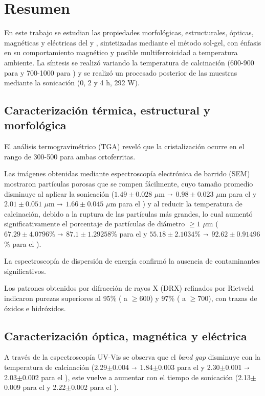 \documentclass[../main.tex]{subfiles}
\begin{document}
\chapter{Resumen}
En este trabajo se estudian las propiedades morfológicas, estructurales, ópticas, magnéticas y eléctricas del \neod{} y \sama{}, sintetizadas mediante el método sol-gel, con énfasis en su comportamiento magnético y posible multiferroicidad a temperatura ambiente. La síntesis se realizó variando la temperatura de calcinación (600-900\gradoC{} para \neod{} y 700-1000\gradoC{} para \sama) y se realizó un procesado posterior de las muestras mediante la sonicación (0, 2 y 4 h, 292 W).

\section{Caracterización térmica, estructural y morfológica}
El análisis termogravimétrico (TGA) reveló que la cristalización ocurre en el rango de 300-500\gradoC{} para ambas ortoferritas.

Las imágenes obtenidas mediante espectroscopía electrónica de barrido (SEM) mostraron partículas porosas que se rompen fácilmente, cuyo tamaño promedio disminuye al aplicar la sonicación ($1.49\pm0.028$ $\mu$m $\shortrightarrow$ $0.98\pm0.023$ $\mu$m para el \neod{} y $2.01\pm0.051$ $\mu$m $\shortrightarrow$ $1.66\pm0.045$ $\mu$m para el \sama{}) y al reducir la temperatura de calcinación, debido a la ruptura de las partículas más grandes, lo cual aumentó significativamente el porcentaje de partículas de diámetro $\geq1$ $\mu$m ($67.29\pm4.0796$\% $\shortrightarrow$ $87.1\pm1.29258$\% para el \neod{} y $55.18\pm2.1034$\% $\shortrightarrow$ $92.62\pm0.91496$\% para el \sama{}).

La espectroscopía de dispersión de energía confirmó la ausencia de contaminantes significativos.

Los patrones obtenidos por difracción de rayos X (DRX) refinados por Rietveld indicaron purezas superiores al 95\% (\neod{} a $\geq$600\gradoC) y 97\% (\sama{} a $\geq$700\gradoC), con trazas de óxidos e hidróxidos.

\section{Caracterización óptica, magnética y eléctrica}
A través de la espectroscopía UV-Vis se observa que el \textit{band gap} disminuye con la temperatura de calcinación (2.29$\pm$0.004 $\shortrightarrow$ 1.84$\pm$0.003 para el \neod{} y 2.30$\pm$0.001 $\shortrightarrow$ 2.03$\pm$0.002 para el \sama{}), este vuelve a aumentar con el tiempo de sonicación (2.13$\pm$0.009 para el \neod{} y 2.22$\pm$0.002 para el \sama{}).
\end{document}
